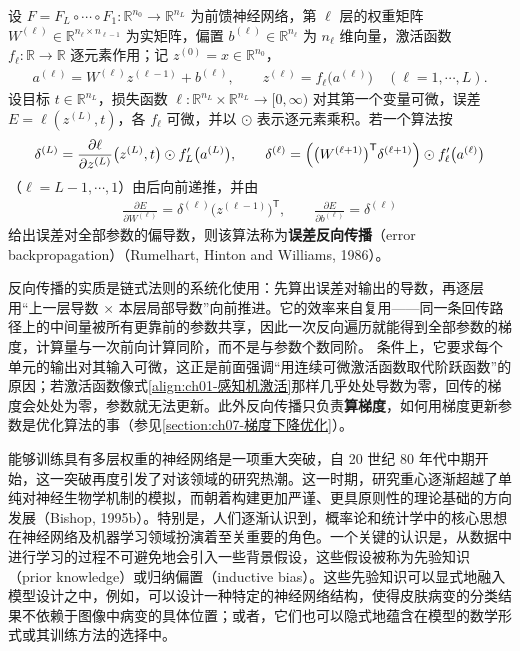 \documentclass[../../main.tex]{subfiles}
\begin{document}
\begin{definition}[误差反向传播]\label{definition:ch01-误差反向传播}
设 $F=F_{L}\circ\cdots\circ F_{1}:\mathbb{R}^{n_{0}}\to\mathbb{R}^{n_{L}}$ 为前馈神经网络，第 $\ell$ 层的权重矩阵 $W^{(\ell)}\in\mathbb{R}^{n_{\ell}\times n_{\ell-1}}$ 为实矩阵，偏置 $b^{(\ell)}\in\mathbb{R}^{n_{\ell}}$ 为 $n_{\ell}$ 维向量，激活函数 $f_{\ell}:\mathbb{R}\to\mathbb{R}$ 逐元素作用；记 $z^{(0)}=x\in\mathbb{R}^{n_{0}}$，
\begin{align*}
  a^{(\ell)}=W^{(\ell)}z^{(\ell-1)}+b^{(\ell)},\qquad
  z^{(\ell)}=f_{\ell}\bigl(a^{(\ell)}\bigr)\quad(\ell=1,\cdots,L).
\end{align*}
设目标 $t\in\mathbb{R}^{n_{L}}$，损失函数 $\ell:\mathbb{R}^{n_{L}}\times\mathbb{R}^{n_{L}}\to[0,\infty)$ 对其第一个变量可微，误差 $E=\ell(z^{(L)},t)$，各 $f_{\ell}$ 可微，并以 $\odot$ 表示逐元素乘积。若一个算法按
\begin{align*}
  \delta^{(L)}=\frac{\partial \ell}{\partial z^{(L)}}\bigl(z^{(L)},t\bigr)\odot f_{L}'\bigl(a^{(L)}\bigr),
  \qquad
  \delta^{(\ell)}=\Bigl(\bigl(W^{(\ell+1)}\bigr)^{\mathsf{T}}\delta^{(\ell+1)}\Bigr)\odot f_{\ell}'\bigl(a^{(\ell)}\bigr)
\end{align*}
（$\ell=L-1,\cdots,1$）由后向前递推，并由
\begin{align*}
  \frac{\partial E}{\partial W^{(\ell)}}=\delta^{(\ell)}\bigl(z^{(\ell-1)}\bigr)^{\mathsf{T}},
  \qquad
  \frac{\partial E}{\partial b^{(\ell)}}=\delta^{(\ell)}
\end{align*}
给出误差对全部参数的偏导数，则该算法称为\textbf{误差反向传播}（error backpropagation）（Rumelhart, Hinton and Williams, 1986）。
\end{definition}

\begin{remark}
反向传播的实质是链式法则的系统化使用：先算出误差对输出的导数，再逐层用“上一层导数 × 本层局部导数”向前推进。它的效率来自复用——同一条回传路径上的中间量被所有更靠前的参数共享，因此一次反向遍历就能得到全部参数的梯度，计算量与一次前向计算同阶，而不是与参数个数同阶。
条件上，它要求每个单元的输出对其输入可微，这正是前面强调“用连续可微激活函数取代阶跃函数”的原因；若激活函数像式\eqref{align:ch01-感知机激活}那样几乎处处导数为零，回传的梯度会处处为零，参数就无法更新。此外反向传播只负责\textbf{算梯度}，如何用梯度更新参数是优化算法的事（参见\cref{section:ch07-梯度下降优化}）。
\end{remark}

能够训练具有多层权重的神经网络是一项重大突破，自 20 世纪 80 年代中期开始，这一突破再度引发了对该领域的研究热潮。这一时期，研究重心逐渐超越了单纯对神经生物学机制的模拟，而朝着构建更加严谨、更具原则性的理论基础的方向发展（Bishop, 1995b）。特别是，人们逐渐认识到，概率论和统计学中的核心思想在神经网络及机器学习领域扮演着至关重要的角色。一个关键的认识是，从数据中进行学习的过程不可避免地会引入一些背景假设，这些假设被称为先验知识（prior knowledge）或归纳偏置（inductive bias）。这些先验知识可以显式地融入模型设计之中，例如，可以设计一种特定的神经网络结构，使得皮肤病变的分类结果不依赖于图像中病变的具体位置；或者，它们也可以隐式地蕴含在模型的数学形式或其训练方法的选择中。
\end{document}
